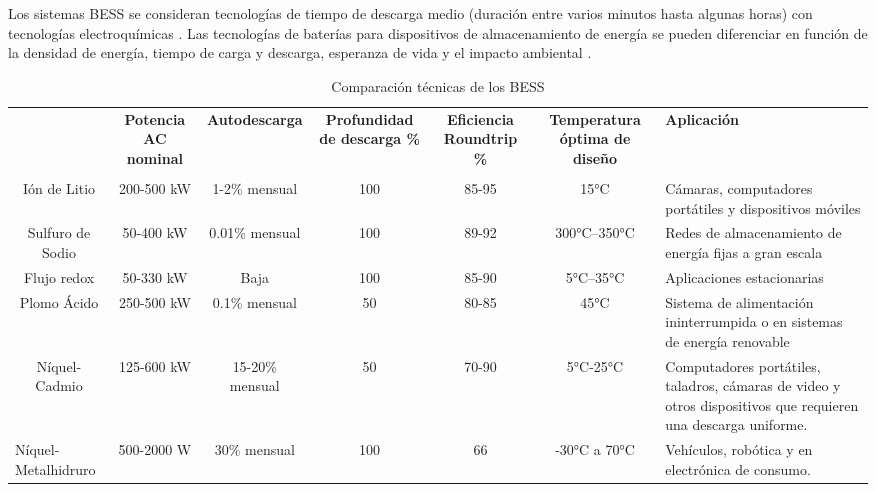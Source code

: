 \newline
Los sistemas BESS se consideran tecnologías de tiempo de descarga medio (duración entre varios minutos hasta algunas horas) con tecnologías electroquímicas \cite{bess_distritall}. Las tecnologías de baterías para dispositivos de almacenamiento de energía se pueden diferenciar en función de la densidad de energía, tiempo de carga y descarga, esperanza de vida y el impacto ambiental \cite{Handbook}.
\newpage
\begin{table}[htbp]

  \centering
  \caption{Comparación técnicas de los BESS}
  \resizebox{16cm}{!} {
    \begin{tabular}{|p{10em}|c|c|c|c|c|p{11em}|}
    \rowcolor[rgb]{ .051,  .051,  .051} \multicolumn{1}{|c|}{\textcolor[rgb]{ 1,  1,  1}{\textbf{PARÁMETROS }}} & \multicolumn{1}{p{10em}|}{\textcolor[rgb]{ 1,  1,  1}{\textbf{Potencia AC nominal}}} & \multicolumn{1}{p{10em}|}{\textcolor[rgb]{ 1,  1,  1}{\textbf{Autodescarga}}} & \multicolumn{1}{p{10em}|}{\textcolor[rgb]{ 1,  1,  1}{\textbf{Profundidad de descarga \%}}} & \multicolumn{1}{p{10em}|}{\textcolor[rgb]{ 1,  1,  1}{\textbf{Eficiencia Roundtrip \newline{}\%}}} & \multicolumn{1}{p{10em}|}{\textcolor[rgb]{ 1,  1,  1}{\textbf{Temperatura óptima de diseño}}} & \textcolor[rgb]{ 1,  1,  1}{\textbf{Aplicación}} \\
    \rowcolor[rgb]{ .051,  .051,  .051} \multicolumn{1}{|c|}{\textcolor[rgb]{ 1,  1,  1}{\textbf{BATERÍAS}}} & \textcolor[rgb]{ 1,  1,  1}{} & \textcolor[rgb]{ 1,  1,  1}{} & \textcolor[rgb]{ 1,  1,  1}{} & \textcolor[rgb]{ 1,  1,  1}{} & \textcolor[rgb]{ 1,  1,  1}{} & \multicolumn{1}{r|}{\textcolor[rgb]{ 1,  1,  1}{}} \\
    \multicolumn{1}{|c|}{Ión de Litio} & \multicolumn{1}{|c|}{200-500 kW} & 1-2\% mensual  & 100   & 85-95 & 15°C  & Cámaras,  computadores portátiles y dispositivos móviles  \\
    \hline
    \multicolumn{1}{|c|}{Sulfuro de Sodio} & 50-400 kW & 0.01\%  mensual  & 100   & 89-92 & 300°C–350°C &  Redes de almacenamiento de energía fijas a gran escala \\
    \hline
    \multicolumn{1}{|c|}{Flujo redox} & 50-330 kW & Baja  & 100   & 85-90 & 5°C–35°C &  Aplicaciones \newline{}estacionarias  \\
    \hline
     \multicolumn{1}{|c|}{Plomo Ácido} & 250-500 kW & 0.1\% mensual & 50    & 80-85 & 45°C  & Sistema de alimentación ininterrumpida o en sistemas   de energía renovable \\
    \hline
    \multicolumn{1}{|c|}{ Níquel-Cadmio} & 125-600 kW & 15-20\% mensual & 50    & 70-90 & 5°C-25°C & Computadores portátiles, taladros, cámaras de video  y otros dispositivos que requieren una descarga  uniforme. \\
    \hline
     Níquel-Metalhidruro & 500-2000 W & 30\% mensual & 100   & 66    & -30°C a 70°C &  Vehículos, robótica y en electrónica de consumo.    \\
    \bottomrule
    \end{tabular}%
    }
  \label{tab:addlabel}%
  

\end{table}
